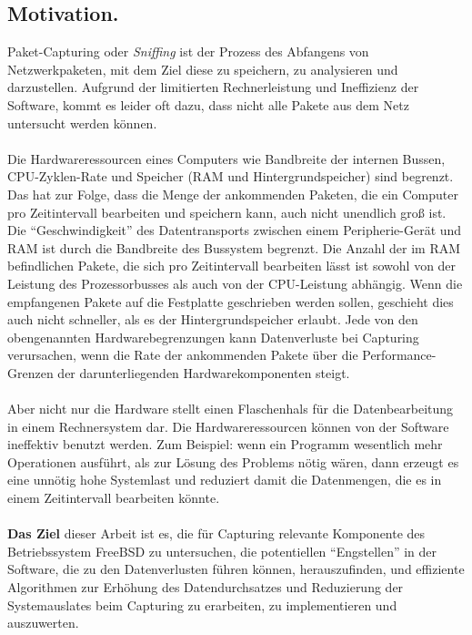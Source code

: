 \subsection{Motivation.}
Paket-Capturing oder \emph{Sniffing} ist der Prozess des Abfangens von
Netzwerkpaketen, mit dem Ziel diese zu speichern, zu analysieren und
darzustellen. Aufgrund der limitierten Rechnerleistung und Ineffizienz der
Software, kommt es leider oft dazu, dass nicht alle Pakete aus dem Netz
untersucht werden können.  \\\\
Die Hardwareressourcen eines Computers wie Bandbreite der internen Bussen,
CPU-Zyklen-Rate und Speicher (RAM und Hintergrundspeicher) sind begrenzt. Das
hat zur Folge, dass die Menge der ankommenden Paketen, die ein Computer pro
Zeitintervall bearbeiten und speichern kann, auch nicht unendlich groß ist.
Die ``Geschwindigkeit'' des Datentransports zwischen einem  Peripherie-Gerät
und RAM  ist durch die Bandbreite des Bussystem begrenzt. Die Anzahl der im RAM
befindlichen Pakete, die sich pro Zeitintervall bearbeiten lässt ist sowohl von
der Leistung  des Prozessorbusses als auch von der CPU-Leistung abhängig. Wenn
die empfangenen Pakete auf die Festplatte geschrieben werden sollen, geschieht
dies auch nicht schneller, als es der Hintergrundspeicher erlaubt. Jede von den
obengenannten Hardwarebegrenzungen kann Datenverluste bei Capturing
verursachen, wenn die Rate der ankommenden Pakete über die Performance-Grenzen
der darunterliegenden Hardwarekomponenten steigt.  \\\\
Aber nicht nur die Hardware stellt einen Flaschenhals für die Datenbearbeitung
in einem Rechnersystem dar. Die Hardwareressourcen können von der Software
ineffektiv benutzt werden. Zum Beispiel: wenn ein Programm wesentlich mehr
Operationen ausführt, als zur Lösung des Problems nötig wären, dann erzeugt es
eine unnötig hohe Systemlast und reduziert damit die Datenmengen, die es in
einem Zeitintervall bearbeiten könnte.  \\\\
%
\textbf{Das Ziel} dieser Arbeit ist es, die für Capturing relevante Komponente des
Betriebssystem FreeBSD zu untersuchen, die potentiellen ``Engstellen'' in der
Software, die zu den Datenverlusten führen können,  herauszufinden, und
effiziente Algorithmen zur Erhöhung des Datendurchsatzes und Reduzierung der
Systemauslates beim Capturing zu erarbeiten, zu implementieren und auszuwerten.
